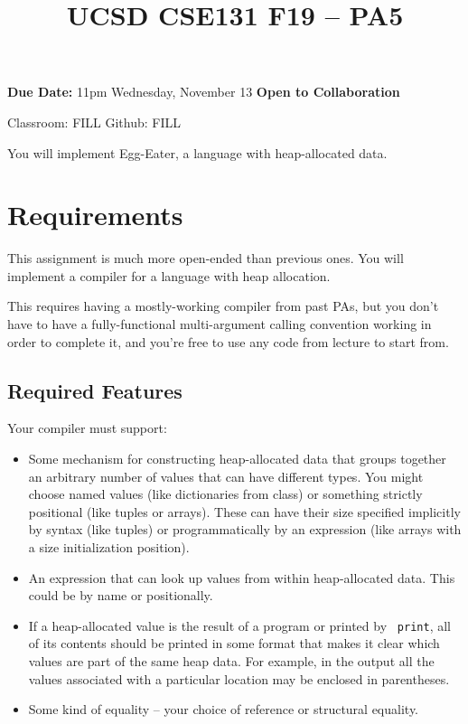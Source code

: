 \documentclass[10pt, oneside]{article}
\title{UCSD CSE131 F19 -- PA5}
\begin{document}
\maketitle 

{\bf Due Date:} 11pm Wednesday, November 13 \hspace{2em} {\bf Open to Collaboration}

Classroom: FILL \hspace{1em} Github: FILL

You will implement Egg-Eater, a language with heap-allocated data.

\section*{Requirements}

This assignment is much more open-ended than previous ones. You will
implement a compiler for a language with heap allocation.

This requires having a mostly-working compiler from past PAs, but you don't
have to have a fully-functional multi-argument calling convention working in
order to complete it, and you're free to use any code from lecture to start
from.

\subsection*{Required Features}

Your compiler must support:

\begin{itemize}

\item Some mechanism for constructing heap-allocated data that groups
together an arbitrary number of values that can have different types. You
might choose named values (like dictionaries from class) or something
strictly positional (like tuples or arrays). These can have their size
specified implicitly by syntax (like tuples) or programmatically by an
expression (like arrays with a size initialization position).

\item An expression that can look up values from within heap-allocated data.
This could be by name or positionally.

\item If a heap-allocated value is the result of a program or printed by {\tt
print}, all of its contents should be printed in some format that makes it
clear which values are part of the same heap data. For example, in the output
all the values associated with a particular location may be enclosed in
parentheses.

\item Some kind of equality -- your choice of reference or structural equality.
\end{itemize}
\end{document}

